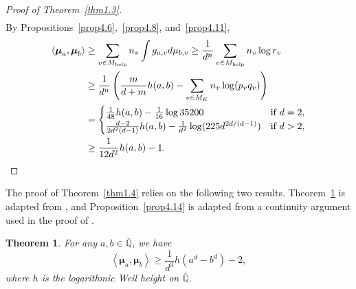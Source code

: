 \documentclass[11pt]{amsart}
\numberwithin{equation}{section}
\theoremstyle{plain}
\newtheorem{thm}{Theorem}[section]
\theoremstyle{definition}
\theoremstyle{remark}
\newcommand{\Q}{\mathbb Q}
\newcommand{\help}{\mathrm{help}}
\renewcommand{\bar}{\overline}
\begin{document}
\begin{proof}[Proof of Theorem~\ref{thm1.3}]
\begin{align*}
\end{align*}
By Propositions~\ref{prop4.6},~\ref{prop4.8}, and~\ref{prop4.11},
\begin{align*}
\left\langle \boldsymbol{\mu}_{a},\boldsymbol{\mu}_{b}\right\rangle  & \geq\sum_{v\in M_{\help}}n_{v}\int g_{a,v}d\mu_{b,v}\geq\frac{1}{d^{n}}\sum_{v\in M_{\help}}n_{v}\log r_{v}\\
 & \geq\frac{1}{d^{n}}\left(\frac{m}{d+m}h(a,b)-\sum_{v\in M_{K}}n_{v}\log(p_{v}q_{v})\right)\\
 & =\begin{cases}
\frac{1}{48}h(a,b)-\frac{1}{16}\log35200 & \text{if }d=2,\\
\frac{d-2}{2d^{2}(d-1)}h(a,b)-\frac{1}{d^{2}}\log(225d^{2d/(d-1)}) & \text{if }d>2,
\end{cases}\\
 & \geq\frac{1}{12d^{2}}h(a,b)-1.\qedhere
\end{align*}
\end{proof}

The proof of Theorem~\ref{thm1.4} relies on the following two results.
Theorem~\ref{thm4.13} is adapted from \cite[Theorem 7.1]{DKY2},
and Proposition~\ref{prop4.14} is adapted from a continuity argument
used in the proof of \cite[Theorem 1.6]{DKY2}.

\begin{thm}
\label{thm4.13}For any $a,b\in\bar{\Q}$, we have
\[
\left\langle \boldsymbol{\mu}_{a},\boldsymbol{\mu}_{b}\right\rangle \geq\frac{1}{d^{3}}h\left(a^{d}-b^{d}\right)-2,
\]
where $h$ is the logarithmic Weil height on $\bar{\Q}$.
\end{thm}
\end{document}
